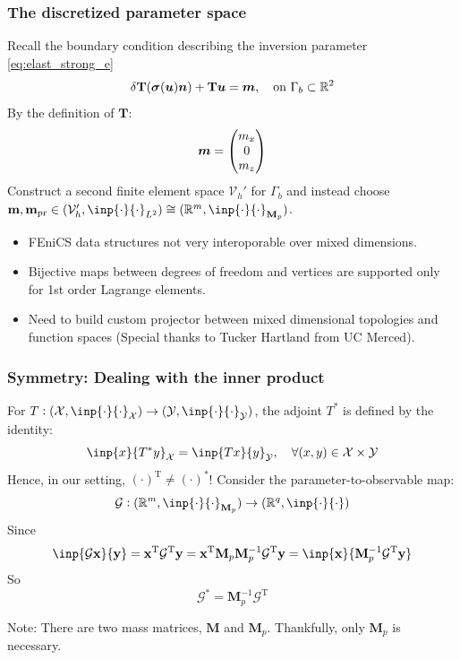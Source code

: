 \documentclass[
  pdf,
  10pt,
  xcolor={svgnames},
]{beamer}
\newcommand{\mc}[1]{\mathcal{#1}}
\newcommand{\R}{\mathbb{R}}
\newcommand{\T}{\mathrm{T}}
\renewcommand{\vec}[1]{{\mathchoice
                     {\mbox{\boldmath$\displaystyle{#1}$}}
                     {\mbox{\boldmath$\textstyle{#1}$}}
                     {\mbox{\boldmath$\scriptstyle{#1}$}}
                     {\mbox{\boldmath$\scriptscriptstyle{#1}$}}}}
\newcommand{\mat}[1]{\mathbf{{#1}}}
\begin{document}
\begin{frame}
  \frametitle{The discretized parameter space}
  Recall the boundary condition describing the inversion parameter
  \eqref{eq:elast_strong_e}
  \[
    \delta \mat{T}(\vec{\sigma}(\vec{u}) \vec{n}) + \mat{T}\vec{u}
    = \vec{m}
    , \quad \text{on } \Gamma_b \subset \R^2
  \]
  By the definition of $\mat{T}$:
  \[
    \vec{m} = \begin{pmatrix} m_x \\ 0 \\ m_z \end{pmatrix}
  \]
  Construct a second finite element space $\mc{V}_h'$ for $\Gamma_b$ and instead
  choose $\vb{m}, \vb{m}_{\rm pr} \in (\mc{V}_h', \inp{\cdot}{\cdot}_{L^2}) \cong
  (\R^m, \inp{\cdot}{\cdot}_{\mat{M}_p})$.
  \pause 
  \begin{itemize}[<+->]
    \item FEniCS data structures not very interoporable over mixed dimensions.
    \item Bijective maps between degrees of freedom and vertices are supported
      only for 1st order Lagrange elements.
    \item Need to build custom projector between mixed dimensional topologies
      and function spaces (Special thanks to Tucker Hartland from UC Merced).
  \end{itemize}
\end{frame}

\begin{frame}
  \frametitle{Symmetry: Dealing with the inner product}
  For $T: (\mc{X}, \inp{\cdot}{\cdot}_\mc{X}) \to (\mc{Y},
  \inp{\cdot}{\cdot}_\mc{Y})$, the adjoint $T^*$ is defined by the identity:
  \[
    \inp{x}{T^*y}_\mc{X} = \inp{Tx}{y}_\mc{Y}
    , \quad \forall (x,y) \in \mc{X} \times \mc{Y}
  \]
  Hence, in our setting, $(\cdot)^\T \neq (\cdot)^*$!
  \pause
  Consider the parameter-to-observable map:
  \[
    \mc{G}:
    (\R^m, \inp{\cdot}{\cdot}_{\mat{M}_p}) \to (\R^q, \inp{\cdot}{\cdot})
  \]
  Since
  \[
    \inp{\mc{G}\vb{x}}{\vb{y}}
    = \vb{x}^\T \mc{G}^\T \vb{y}
    = \vb{x}^\T \mat{M}_p \mat{M}_p^{-1} \mc{G}^\T  \vb{y}
    = \inp{\vb{x}}{\mat{M}_p^{-1} \mc{G}^\T \vb{y}}
  \]
  So
  \[
    \mc{G}^* = \mat{M}_p^{-1}\mc{G}^\T
  \]
  \pause
  \vspace{-1em}
  \begin{alertblock}{Note:}
    There are two mass matrices, $\mat{M}$ and $\mat{M}_p$. Thankfully, only
    $\mat{M}_p$ is necessary.
  \end{alertblock}
\end{frame}
\end{document}

